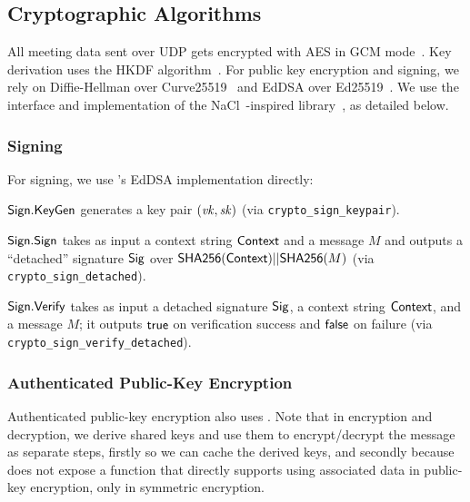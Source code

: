 \subsection{Cryptographic Algorithms}\label{subsec:cryptoalgs}

All meeting data sent over UDP gets encrypted with AES in GCM mode~\cite{sp80038d}.
%
Key derivation uses the HKDF algorithm~\cite{rfc5869}.
%
For public key encryption and signing, we rely on Diffie-Hellman over
Curve25519~\cite{bernstein2006curve25519} and EdDSA over Ed25519~\cite{eddsa}.
%
We use the interface and implementation of the NaCl~\cite{nacl}-inspired \sodium{}
library~\cite{libsodium}, as detailed below.

\subsubsection{Signing}

For signing, we use \sodium 's EdDSA implementation directly:
%
\begin{itemize*}
   \item ${\sf Sign}.\mathsf{KeyGen}$ generates a key pair $(\mathit{vk}, \mathit{sk})$ (via
   \texttt{crypto\_sign\_keypair}).
   \item ${\sf Sign}.\mathsf{Sign}$ takes as input a context string ${\sf Context}$ and a message $M$ and outputs a
   ``detached'' signature ${\sf Sig}$ over ${\sf SHA256}({\sf Context}) || {\sf SHA256}(M)$ (via
   \texttt{crypto\_sign\_detached}).
   \item ${\sf Sign}.\mathsf{Verify}$ takes as input a detached signature ${\sf Sig}$, a context
   string ${\sf Context}$, and a message $M$; it outputs $\mathsf{true}$ on verification success and $\mathsf{false}$ on
   failure (via \texttt{crypto\_\-sign\_\-verify\_\-detached}).
\end{itemize*}

\subsubsection{Authenticated Public-Key Encryption}

Authenticated public-key encryption also uses \sodium. Note that in encryption and decryption, we
derive shared keys and use them to encrypt/decrypt the message as separate steps, firstly so we can
cache the derived keys, and secondly because \sodium{} does not expose a function that directly
supports using associated data in public-key encryption, only in symmetric encryption.


